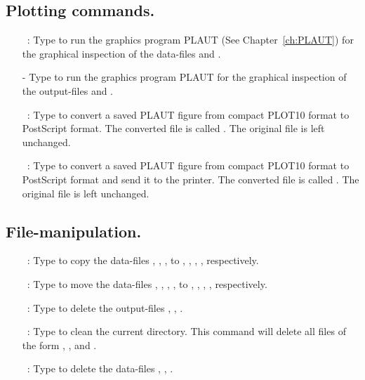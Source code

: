 \subsection{ Plotting commands.} 

\begin{itemize}

\item[\commandf{@p}]~:
  Type  to run the graphics program {\cal PLAUT}
  (See Chapter~\ref{ch:PLAUT})
  for the graphical inspection of the data-files 
   and . 
\item[-]
  Type  to run the graphics program {\cal PLAUT}
  for the graphical inspection of the output-files 
   and .

\item[\commandf{@ps}]~:
  Type  to convert a saved {\cal PLAUT} figure 
  from compact {\cal PLOT10} format to {\cal PostScript} format.
  The converted file is called . 
  The original file is left unchanged.

\item[\commandf{@pr}]~:
  Type  to convert a saved {\cal PLAUT} figure 
  from compact {\cal PLOT10} format to {\cal PostScript} format and send it to the
  printer.
  The converted file is called . 
  The original file is left unchanged.
\end{itemize}

\subsection{ File-manipulation.} 

\begin{itemize}

\item[\commandf{@cp}]~:
  Type  
  to copy the data-files 
  , , ,  to
  , , , , respectively.

\item[\commandf{@mv}]~:
  Type  
  to move the data-files 
  , , , , to
  , , , , respectively.

\item[\commandf{@df}]~:
  Type  
  to delete the output-files 
  , , .

\item[\commandf{@cl}]~:
  Type  
  to clean the current directory.
  This command will delete  all files of the form
  , , and .

\item[\commandf{@dl}]~:
  Type  
 to delete the data-files 
  , , .
\end{itemize}

